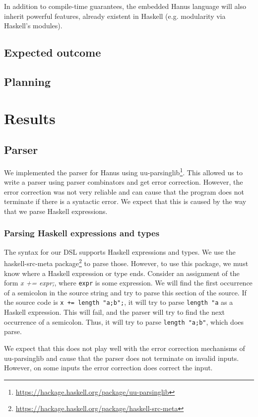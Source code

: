 \documentclass[12pt,a4paper]{article}
\begin{document}
In addition to compile-time guarantees, the embedded Hanus language will also inherit powerful features, already existent in Haskell (e.g. modularity via Haskell's modules).

    \subsection{Expected outcome}
    \subsection{Planning}
\section{Results}
\label{section:results}

\subsection{Parser}
We implemented the parser for Hanus using uu-parsinglib\footnote{\url{https://hackage.haskell.org/package/uu-parsinglib}}. This allowed us to write a parser using parser combinators and get error correction. However, the error correction was not very reliable and can cause that the program does not terminate if there is a syntactic error. We expect that this is caused by the way that we parse Haskell expressions.

\subsubsection{Parsing Haskell expressions and types}
The syntax for our DSL supports Haskell expressions and types. We use the haskell-src-meta package\footnote{\url{https://hackage.haskell.org/package/haskell-src-meta}} to parse those. However, to use this package, we must know where a Haskell expression or type ends. Consider an assignment of the form \textit{x += expr;}, where \texttt{expr} is some expression. We will find the first occurrence of a semicolon in the source string and try to parse this section of the source. If the source code is \texttt{x += length "a;b";}, it will try to parse \texttt{length "a} as a Haskell expression. This will fail, and the parser will try to find the next occurrence of a semicolon. Thus, it will try to parse \texttt{length "a;b"}, which does parse.

We expect that this does not play well with the error correction mechanisms of uu-parsinglib and cause that the parser does not terminate on invalid inputs. However, on some inputs the error correction does correct the input.
\end{document}
